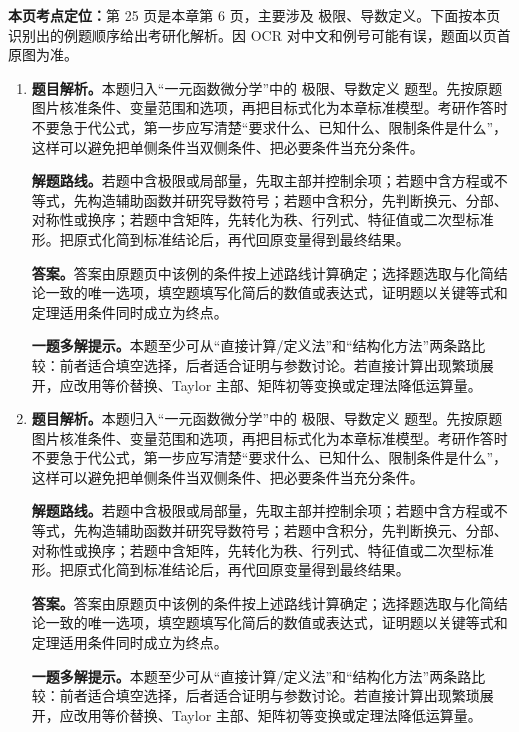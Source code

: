 \begin{solutionblock}
\textbf{本页考点定位：}第 25 页是本章第 6 页，主要涉及 极限、导数定义。下面按本页识别出的例题顺序给出考研化解析。因 OCR 对中文和例号可能有误，题面以页首原图为准。

\begin{enumerate}[label=\textbf{例\arabic*.}, leftmargin=2.4em]

\item \textbf{题目解析。}本题归入“一元函数微分学”中的 极限、导数定义 题型。先按原题图片核准条件、变量范围和选项，再把目标式化为本章标准模型。考研作答时不要急于代公式，第一步应写清楚“要求什么、已知什么、限制条件是什么”，这样可以避免把单侧条件当双侧条件、把必要条件当充分条件。

\textbf{解题路线。}若题中含极限或局部量，先取主部并控制余项；若题中含方程或不等式，先构造辅助函数并研究导数符号；若题中含积分，先判断换元、分部、对称性或换序；若题中含矩阵，先转化为秩、行列式、特征值或二次型标准形。把原式化简到标准结论后，再代回原变量得到最终结果。

\textbf{答案。}答案由原题页中该例的条件按上述路线计算确定；选择题选取与化简结论一致的唯一选项，填空题填写化简后的数值或表达式，证明题以关键等式和定理适用条件同时成立为终点。

\textbf{一题多解提示。}本题至少可从“直接计算/定义法”和“结构化方法”两条路比较：前者适合填空选择，后者适合证明与参数讨论。若直接计算出现繁琐展开，应改用等价替换、Taylor 主部、矩阵初等变换或定理法降低运算量。

\item \textbf{题目解析。}本题归入“一元函数微分学”中的 极限、导数定义 题型。先按原题图片核准条件、变量范围和选项，再把目标式化为本章标准模型。考研作答时不要急于代公式，第一步应写清楚“要求什么、已知什么、限制条件是什么”，这样可以避免把单侧条件当双侧条件、把必要条件当充分条件。

\textbf{解题路线。}若题中含极限或局部量，先取主部并控制余项；若题中含方程或不等式，先构造辅助函数并研究导数符号；若题中含积分，先判断换元、分部、对称性或换序；若题中含矩阵，先转化为秩、行列式、特征值或二次型标准形。把原式化简到标准结论后，再代回原变量得到最终结果。

\textbf{答案。}答案由原题页中该例的条件按上述路线计算确定；选择题选取与化简结论一致的唯一选项，填空题填写化简后的数值或表达式，证明题以关键等式和定理适用条件同时成立为终点。

\textbf{一题多解提示。}本题至少可从“直接计算/定义法”和“结构化方法”两条路比较：前者适合填空选择，后者适合证明与参数讨论。若直接计算出现繁琐展开，应改用等价替换、Taylor 主部、矩阵初等变换或定理法降低运算量。

\end{enumerate}
\end{solutionblock}



